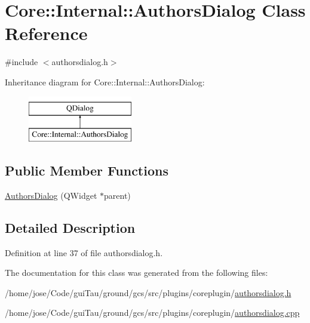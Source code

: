 \hypertarget{class_core_1_1_internal_1_1_authors_dialog}{\section{Core\-:\-:Internal\-:\-:Authors\-Dialog Class Reference}
\label{class_core_1_1_internal_1_1_authors_dialog}
}


{\ttfamily \#include $<$authorsdialog.\-h$>$}

Inheritance diagram for Core\-:\-:Internal\-:\-:Authors\-Dialog\-:\begin{figure}[H]
\begin{center}
\leavevmode
\includegraphics[height=2.000000cm]{class_core_1_1_internal_1_1_authors_dialog}
\end{center}
\end{figure}
\subsection*{Public Member Functions}
\begin{DoxyCompactItemize}
\item 
\hyperlink{group___core_plugin_ga8135a04d18c6e023051614472f4e6f9a}{Authors\-Dialog} (Q\-Widget $\ast$parent)
\end{DoxyCompactItemize}


\subsection{Detailed Description}


Definition at line 37 of file authorsdialog.\-h.



The documentation for this class was generated from the following files\-:\begin{DoxyCompactItemize}
\item 
/home/jose/\-Code/gui\-Tau/ground/gcs/src/plugins/coreplugin/\hyperlink{authorsdialog_8h}{authorsdialog.\-h}\item 
/home/jose/\-Code/gui\-Tau/ground/gcs/src/plugins/coreplugin/\hyperlink{authorsdialog_8cpp}{authorsdialog.\-cpp}\end{DoxyCompactItemize}
